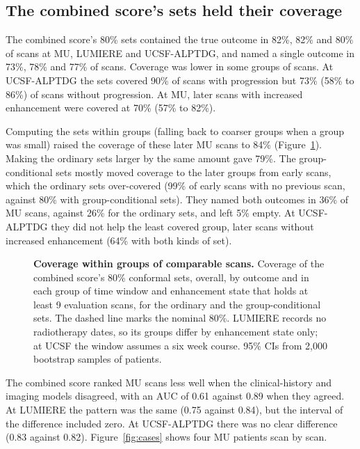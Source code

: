 \documentclass[largeformat]{interact} %
\begin{document}
\subsection{The combined score's sets held their coverage}\label{sec:3.4}

The combined score's 80\% sets contained the true outcome in 82\%, 82\% and 80\% of scans at MU, LUMIERE and
UCSF-ALPTDG, and named a single outcome in 73\%, 78\% and 77\% of scans. Coverage was lower in some groups of scans. At UCSF-ALPTDG the sets covered 90\% of scans with progression but 73\% (58\% to 86\%) of scans without
progression. At MU, later scans with increased enhancement were covered at 70\% (57\% to 82\%).

Computing the sets within groups (falling back to coarser groups when a group was small) raised the coverage of these later MU scans to 84\%
(Figure~\ref{fig:4}). Making the ordinary sets larger by the same amount gave 79\%. The group-conditional sets mostly moved
coverage to the later groups from early scans, which the ordinary sets over-covered (99\% of early scans with no
previous scan, against 80\% with group-conditional sets). They named both outcomes in 36\% of MU scans, against 26\% for the ordinary
sets, and left 5\% empty. At UCSF-ALPTDG they did not help the least covered
group, later scans without increased enhancement (64\% with both kinds of set).

\begin{figure}[!htbp]
\centering
{}
\caption{\textbf{Coverage within groups of comparable scans.} Coverage of the combined score's 80\% conformal sets,
overall, by outcome and in each group of time window and enhancement state that holds at least 9 evaluation scans, for
the ordinary and the group-conditional sets. The dashed line marks the nominal 80\%. LUMIERE
records no radiotherapy dates, so its groups differ by enhancement state only; at UCSF the window assumes a six week
course. 95\% CIs from 2,000 bootstrap samples of patients.}
\label{fig:4}
\end{figure}

The combined score ranked MU scans less well when the clinical-history and imaging models disagreed, with an AUC of
0.61 against 0.89 when they agreed. At LUMIERE the pattern was the same (0.75 against 0.84), but the interval of the difference
included zero. At UCSF-ALPTDG there was no clear difference (0.83 against 0.82). Figure~\ref{fig:cases} shows four MU patients scan by
scan.
\end{document}
